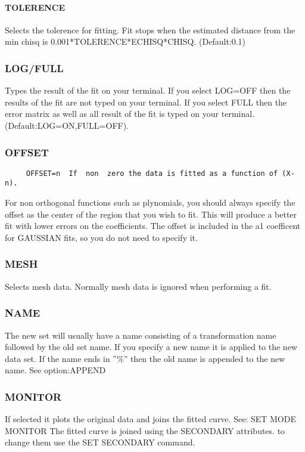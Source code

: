 \paragraph{TOLERENCE   }
Selects  the  tolerence  for  fitting.   Fit stops when the estimated
distance from the min chisq is 0.001*TOLERENCE*ECHISQ*CHISQ.  
(Default:0.1) 
\subsubsection{LOG/FULL    }
Types  the  result  of the fit on your terminal.  If you select LOG=OFF
then the results of the fit are not typed on  your  terminal.   If  you
select  FULL  then the error matrix as well as all result of the fit is
typed on your terminal.  
(Default:LOG=ON,FULL=OFF).  
\subsubsection{OFFSET      }
\begin{verbatim}
     OFFSET=n  If  non  zero the data is fitted as a function of (X-n).
\end{verbatim}
For non orthogonal functions such  as  plynomials,  you  should  always
specify  the  offset  as the center of the region that you wish to fit.
This will produce a better fit with lower errors on  the  coefficients.
The  offset  is included in the a1 coefficent for GAUSSIAN fits, so you
do not need to specify it.  
\subsubsection{MESH        }
Selects  mesh  data.   Normally  mesh data is ignored when performing a
fit.  
\subsubsection{NAME        }
The  new  set  will  usually have a name consisting of a transformation
name followed by the old set name.  If you specify a  new  name  it  is
applied to the new data set.  If the name ends in ''\%'' then the old name
is appended to the new name.  See option:APPEND 
\subsubsection{MONITOR     }
If selected it plots the original data and joins the fitted curve.  
See:  SET MODE MONITOR 
The  fitted  curve is joined using the SECONDARY attributes.  to change
them use the SET SECONDARY command.  

